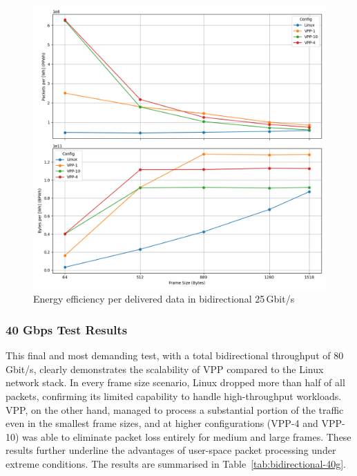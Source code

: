 \begin{figure}[!htbp]
    \centering
    \includegraphics[width=\linewidth]{images/consumption-bi-25g.png}
    \caption{Energy efficiency per delivered data in bidirectional 25\,Gbit/s}
    \label{fig:bi-25g}
\end{figure}



\subsubsection{40 Gbps Test Results}

This final and most demanding test, with a total bidirectional throughput of 80\,Gbit/s, clearly demonstrates the scalability of VPP compared to the Linux network stack.  
In every frame size scenario, Linux dropped more than half of all packets, confirming its limited capability to handle high-throughput workloads.  
VPP, on the other hand, managed to process a substantial portion of the traffic even in the smallest frame sizes, 
and at higher configurations (VPP-4 and VPP-10) was able to eliminate packet loss entirely for medium and large frames.  
These results further underline the advantages of user-space packet processing under extreme conditions.
The results are summarised in Table~\ref{tab:bidirectional-40g}.

